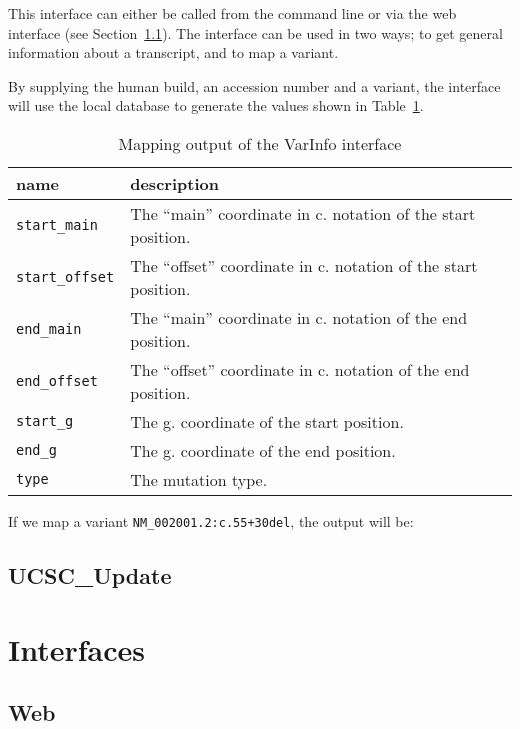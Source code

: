 \documentclass{article}
\begin{document}
This interface can either be called from the command line or via the web
interface (see Section~\ref{subsec:webinterface}). The interface can be used
in two ways; to get general information about a transcript, and to map a
variant.

By supplying the human build, an accession number and a variant, the interface
will use the local database to generate the values shown in
Table~\ref{tab:varinfomap}.

\begin{table}[H]
\begin{tabular}{l|p{9cm}}
name                   & description\\
\hline
\texttt{start\_main}   & The ``main'' coordinate in c. notation of the start
                         position.\\
\texttt{start\_offset} & The ``offset'' coordinate in c. notation of the start
                         position.\\
\texttt{end\_main}     & The ``main'' coordinate in c. notation of the end
                         position.\\
\texttt{end\_offset}   & The ``offset'' coordinate in c. notation of the end
                         position.\\
\texttt{start\_g}      & The g. coordinate of the start position.\\
\texttt{end\_g}        & The g. coordinate of the end position.\\
\texttt{type}          & The mutation type.\\
\end{tabular}
\caption{Mapping output of the VarInfo interface} \label{tab:varinfomap}
\end{table}

If we map a variant \texttt{NM\_002001.2:c.55+30del}, the output will be:

\subsection{UCSC\_Update} \label{subsec:ucsc_update}

\newpage

\section{Interfaces} \label{sec:interfaces}

\subsection{Web} \label{subsec:webinterface}
\end{document}
